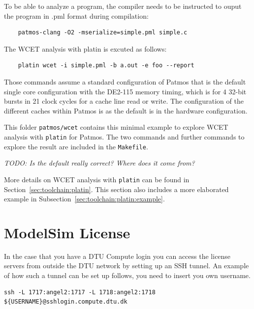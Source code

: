 \documentclass[a4paper,fontsize=10pt,twoside,DIV15,BCOR12mm,headinclude=true,footinclude=false,pagesize,bibtotoc]{scrbook}
\newcommand{\code}[1]{{\texttt{#1}}}
\newcommand{\todo}[1]{{\emph{TODO: #1}}}
\begin{document}
To be able to analyze a program, the compiler needs to be instructed to
ouput the program in .pml format during compilation:

\begin{verbatim}
    patmos-clang -O2 -mserialize=simple.pml simple.c
\end{verbatim}

The WCET analysis with platin is excuted as follows:

\begin{verbatim}
    platin wcet -i simple.pml -b a.out -e foo --report
\end{verbatim}


Those commands assume a standard configuration of Patmos that is
the default single core configuration with the DE2-115 memory timing,
which is for 4 32-bit bursts in 21
clock cycles for a cache line read or write. The configuration of the different
caches within Patmos is as the default is in the hardware configuration.

This folder \code{patmos/wcet} contains this minimal example to explore
WCET analysis with \code{platin} for Patmos.
The two commands and further commands to explore the result are
included in the \code{Makefile}.

\todo{Is the default really correct? Where does it come from?}

More details on WCET analysis with \code{platin} can be found in Section~\ref{sec:toolchain:platin}.
This section also includes a more elaborated example in
Subsection~\ref{sec:toolchain:platin:example}.



\section{ModelSim License}
In the case that you have a DTU Compute login you can access the license servers from outside the DTU network by setting up an SSH tunnel.
An example of how such a tunnel can be set up follows, you need to insert you own username.

\begin{verbatim}
ssh -L 1717:angel2:1717 -L 1718:angel2:1718 ${USERNAME}@sshlogin.compute.dtu.dk
\end{verbatim}
\end{document}
